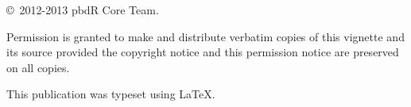 
\null
\vfill
\copyright\ 2012-2013 pbdR Core Team.

Permission is granted to make and distribute verbatim copies of
this vignette and its source provided the copyright notice and
this permission notice are preserved on all copies.

This publication was typeset using \LaTeX.
